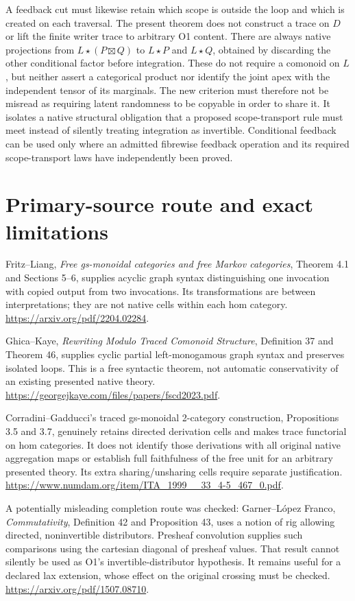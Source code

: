 \documentclass{article}
\begin{document}
A feedback cut must likewise retain which scope is outside the loop and which is created on each traversal. The present theorem does not construct a trace on $D$ or lift the finite writer trace to arbitrary O1 content. There are always native projections from $L\star(P\boxtimes Q)$ to $L\star P$ and $L\star Q$, obtained by discarding the other conditional factor before integration. These do not require a comonoid on $L$, but neither assert a categorical product nor identify the joint apex with the independent tensor of its marginals. The new criterion must therefore not be misread as requiring latent randomness to be copyable in order to share it. It isolates a native structural obligation that a proposed scope-transport rule must meet instead of silently treating integration as invertible. Conditional feedback can be used only where an admitted fibrewise feedback operation and its required scope-transport laws have independently been proved.

\section{Primary-source route and exact limitations}
Fritz--Liang, \emph{Free gs-monoidal categories and free Markov categories}, Theorem 4.1 and Sections 5--6, supplies acyclic graph syntax distinguishing one invocation with copied output from two invocations. Its transformations are between interpretations; they are not native cells within each hom category. \url{https://arxiv.org/pdf/2204.02284}.

Ghica--Kaye, \emph{Rewriting Modulo Traced Comonoid Structure}, Definition 37 and Theorem 46, supplies cyclic partial left-monogamous graph syntax and preserves isolated loops. This is a free syntactic theorem, not automatic conservativity of an existing presented native theory. \url{https://georgejkaye.com/files/papers/fscd2023.pdf}.

Corradini--Gadducci's traced gs-monoidal 2-category construction, Propositions 3.5 and 3.7, genuinely retains directed derivation cells and makes trace functorial on hom categories. It does not identify those derivations with all original native aggregation maps or establish full faithfulness of the free unit for an arbitrary presented theory. Its extra sharing/unsharing cells require separate justification. \url{https://www.numdam.org/item/ITA_1999__33_4-5_467_0.pdf}.

A potentially misleading completion route was checked: Garner--L\'opez Franco, \emph{Commutativity}, Definition 42 and Proposition 43, uses a notion of rig allowing directed, noninvertible distributors. Presheaf convolution supplies such comparisons using the cartesian diagonal of presheaf values. That result cannot silently be used as O1's invertible-distributor hypothesis. It remains useful for a declared lax extension, whose effect on the original crossing must be checked. \url{https://arxiv.org/pdf/1507.08710}.
\end{document}
